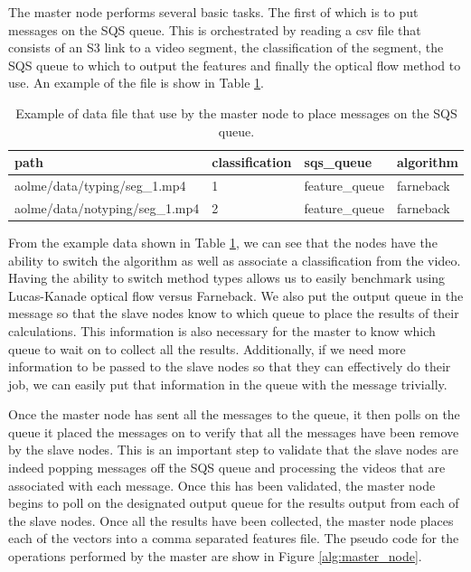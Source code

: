 The master node performs several basic tasks. The first of which is to put
messages on the SQS queue.  This is orchestrated by reading
a csv file that consists of an S3 link to a video segment, the classification of
the segment, the SQS queue to which to output the features and finally the
optical flow method to use. An example of the file is show in Table
 \ref{tab:message_queue}.

\begin{table}[h]
  \begin{tabular}{ | l | l | l | p{2cm} |}
  \hline
  \textbf{path} & \textbf{classification} & \textbf{sqs\_queue} & \textbf{algorithm}\\ \hline
  aolme/data/typing/seg\_1.mp4 & 1 & feature\_queue & farneback \\ \hline
  aolme/data/notyping/seg\_1.mp4 & 2 & feature\_queue & farneback \\
  \hline
  \end{tabular}
  \caption{Example of data file that use by the master node to place messages on
  the SQS queue. }
  \label{tab:message_queue}
\end{table}

\FloatBarrier

From the example data shown in Table \ref{tab:message_queue}, we can see that
the nodes have the ability to switch the algorithm as well as associate a
classification from the video. Having the ability to switch method types allows
us to easily benchmark using Lucas-Kanade optical flow versus Farneback.
We also put the output queue in the message so that the slave nodes know to which
queue to place the results of their calculations. This information is also necessary
for the master to know which queue to wait on to collect all the results. Additionally,
if we need more information to be passed to the slave nodes so that they can
effectively do their job, we can easily put that information in the queue with
the message trivially.

Once the master node has sent all the messages to the queue, it then polls
on the queue it placed the messages on to verify that all the messages have been
remove by the slave nodes. This is an important step to validate that the
slave nodes are indeed popping messages off the SQS queue and processing
the videos that are associated with each message. Once this has been validated,
the master node begins to poll on the designated output queue for the results output
from each of the slave nodes. Once all the results have been collected, the master
node places each of the vectors into a comma separated features file.
The pseudo code for the operations performed by the master are show in Figure
\ref{alg:master_node}.

